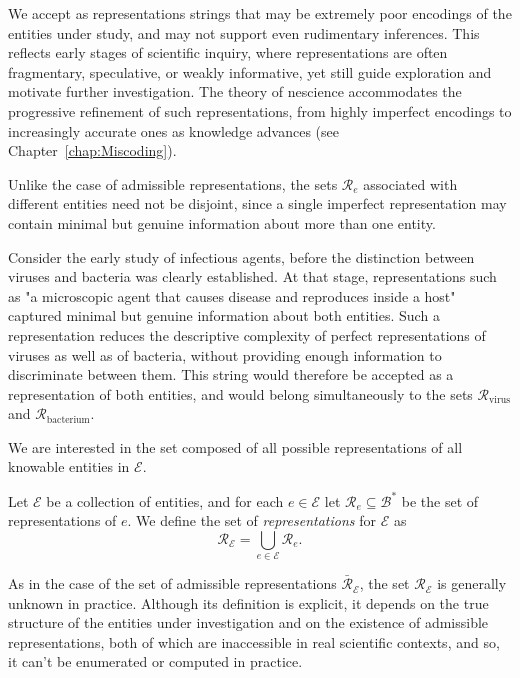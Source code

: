 We accept as representations strings that may be extremely poor encodings of the entities under study, and may not support even rudimentary inferences. This reflects early stages of scientific inquiry, where representations are often fragmentary, speculative, or weakly informative, yet still guide exploration and motivate further investigation. The theory of nescience accommodates the progressive refinement of such representations, from highly imperfect encodings to increasingly accurate ones as knowledge advances (see Chapter~\ref{chap:Miscoding}).

Unlike the case of admissible representations, the sets $\mathcal{R}_e$ associated with different entities need not be disjoint, since a single imperfect representation may contain minimal but genuine information about more than one entity.

\begin{example}
\label{ex:infectious_agents}
Consider the early study of infectious agents, before the distinction between viruses and bacteria was clearly established. At that stage, representations such as "a microscopic agent that causes disease and reproduces inside a host" captured minimal but genuine information about both entities. Such a representation reduces the descriptive complexity of perfect representations of viruses as well as of bacteria, without providing enough information to discriminate between them. This string would therefore be accepted as a representation of both entities, and would belong simultaneously to the sets $\mathcal{R}_{\text{virus}}$ and $\mathcal{R}_{\text{bacterium}}$.
\end{example}

We are interested in the set composed of all possible representations of all knowable entities in $\mathcal{E}$.

\begin{definition}
Let $\mathcal{E}$ be a collection of entities, and for each $e \in \mathcal{E}$ let $\mathcal{R}_e \subseteq \mathcal{B}^\ast$ be the set of representations of $e$. We define the set of \emph{representations} for $\mathcal{E}$ as
\[
\mathcal{R}_{\mathcal{E}} = \bigcup_{e \in \mathcal{E}} \mathcal{R}_e.
\]
\end{definition}

As in the case of the set of admissible representations $\bar{\mathcal{R}}_{\mathcal{E}}$, the set $\mathcal{R}_{\mathcal{E}}$ is generally unknown in practice. Although its definition is explicit, it depends on the true structure of the entities under investigation and on the existence of admissible representations, both of which are inaccessible in real scientific contexts, and so, it can't be enumerated or computed in practice.

